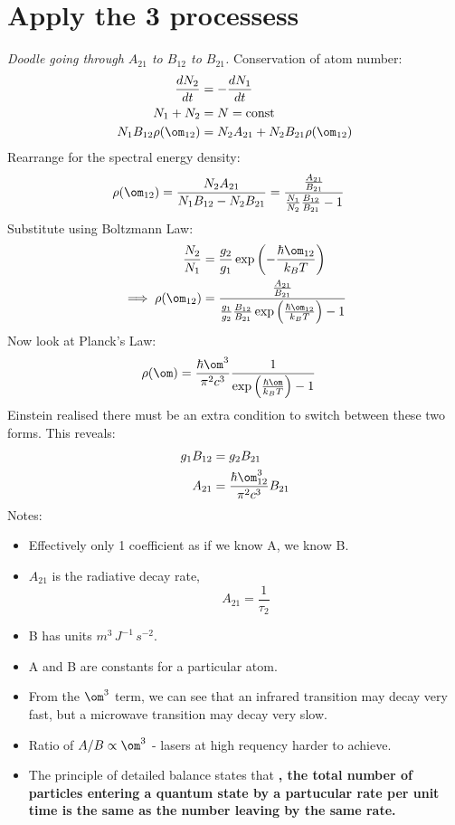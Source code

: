 \documentclass[a4paper, 11pt, normalem]{report}
\begin{document}
\section{Apply the 3 processess}
\textit{Doodle going through $A_{21}$ to $B_{12}$ to $B_{21}$.}
Conservation of atom number:
\begin{align}
    \frac{dN_2}{dt} &= -\frac{dN_1}{dt} \\
    N_1 + N_2 &= N = \text{const} \\
    N_1B_{12}\rho(\om_{12}) &= N_2A_{21} + N_2B_{21}\rho(\om_{12})
\end{align}
Rearrange for the spectral energy density:
\begin{align}
    \rho(\om_{12}) &= \frac{N_2A_{21}}{N_1B_{12}-N_2B_{21}} = \frac{\frac{A_{21}}{B_{21}}}{\frac{N_1}{N_2}\frac{B_{12}}{B_{21}} - 1}
\end{align}
Substitute using Boltzmann Law:
\begin{align}
    \frac{N_2}{N_1} &= \frac{g_2}{g_1}\exp\left(-\frac{\hbar\om_{12}}{k_BT}\right) \\
    \implies \rho(\om_{12}) &= \frac{\frac{A_{21}}{B_{21}}}{\frac{g_1}{g_2}\frac{B_{12}}{B_{21}}\exp\left(\frac{\hbar\om_{12}}{k_BT}\right) - 1}
\end{align}
Now look at Planck's Law:
\begin{align}
    \rho(\om) &= \frac{\hbar\om^3}{\pi^2c^3} \frac{1}{\exp\left(\frac{\hbar\om}{k_BT}\right) - 1}
\end{align}
Einstein realised there must be an extra condition to switch between these two forms.
This reveals:
\begin{align}
    g_1B_{12} &= g_2B_{21} \\
    A_{21} &= \frac{\hbar\om_{12}^3}{\pi^2c^3}B_{21}
\end{align}
Notes:
\begin{itemize}
    \item Effectively only 1 coefficient as if we know A, we know B. 
    \item $A_{21}$ is the radiative decay rate,
        \begin{equation}
            A_{21} = \frac{1}{\tau_2}
        \end{equation}
    \item B has units $m^3\,J^{-1}\,s^{-2}$.
    \item A and B are constants for a particular atom.
    \item From the $\om^3$ term, we can see that an infrared transition may decay very fast, but a microwave transition may decay very slow. 
    \item Ratio of $A/B \propto \om^3$ - lasers at high requency harder to achieve.
    \item The principle of detailed balance states that \textbf{, the total number of particles entering a quantum state by a partucular rate per unit time is the same as the number leaving by the same rate.}
\end{itemize}
\end{document}
